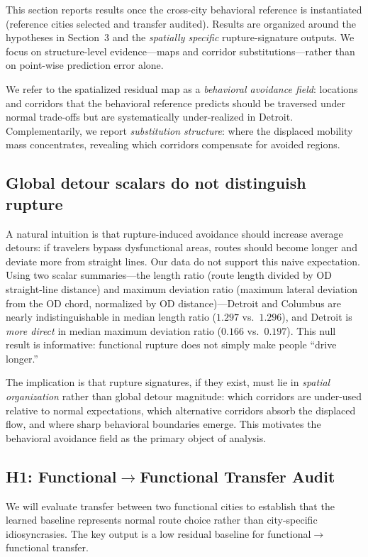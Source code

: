 This section reports results once the cross-city behavioral reference is instantiated (reference cities selected and transfer audited). Results are organized around the hypotheses in Section~3 and the \emph{spatially specific} rupture-signature outputs. We focus on structure-level evidence---maps and corridor substitutions---rather than on point-wise prediction error alone.

We refer to the spatialized residual map as a \emph{behavioral avoidance field}: locations and corridors that the behavioral reference predicts should be traversed under normal trade-offs but are systematically under-realized in Detroit. Complementarily, we report \emph{substitution structure}: where the displaced mobility mass concentrates, revealing which corridors compensate for avoided regions.

\subsection{Global detour scalars do not distinguish rupture}
A natural intuition is that rupture-induced avoidance should increase average detours: if travelers bypass dysfunctional areas, routes should become longer and deviate more from straight lines. Our data do not support this naive expectation. Using two scalar summaries---the length ratio (route length divided by OD straight-line distance) and maximum deviation ratio (maximum lateral deviation from the OD chord, normalized by OD distance)---Detroit and Columbus are nearly indistinguishable in median length ratio ($1.297$ vs.\ $1.296$), and Detroit is \emph{more direct} in median maximum deviation ratio ($0.166$ vs.\ $0.197$). This null result is informative: functional rupture does not simply make people ``drive longer.''

The implication is that rupture signatures, if they exist, must lie in \emph{spatial organization} rather than global detour magnitude: which corridors are under-used relative to normal expectations, which alternative corridors absorb the displaced flow, and where sharp behavioral boundaries emerge. This motivates the behavioral avoidance field as the primary object of analysis.

\subsection{H1: Functional$\to$Functional Transfer Audit}
We will evaluate transfer between two functional cities to establish that the learned baseline represents normal route choice rather than city-specific idiosyncrasies. The key output is a low residual baseline for functional$\to$functional transfer.

